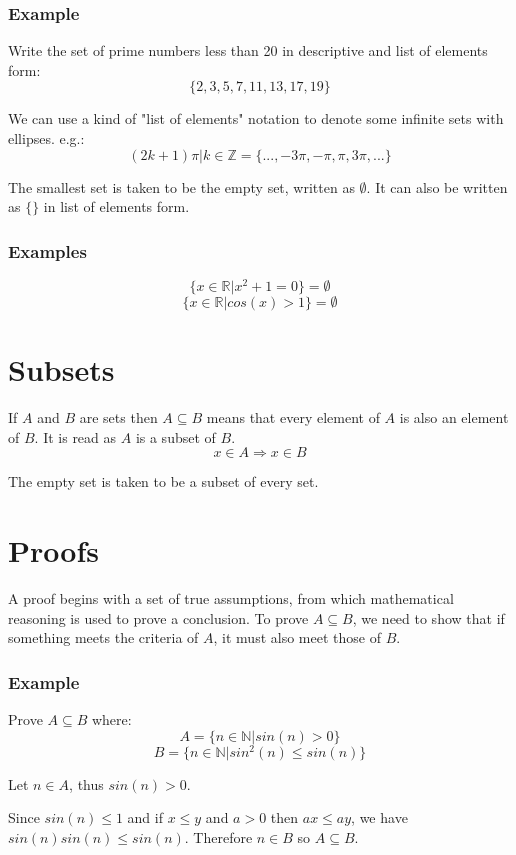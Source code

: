 \documentclass[12pt]{report}
\newcommand{\N}{\mathbb{N}}
\newcommand{\Z}{\mathbb{Z}}
\newcommand{\R}{\mathbb{R}}
\begin{document}
\begin{flushleft}
\subsubsection*{Example}
Write the set of prime numbers less than 20 in descriptive and list of elements form:
\[\{2, 3, 5, 7, 11, 13, 17, 19\}\]

We can use a kind of "list of elements" notation to denote some infinite sets with ellipses.
e.g.: \[(2k + 1)\pi | k \in \Z = \{..., -3\pi, -\pi, \pi, 3\pi, ...\}\]

The smallest set is taken to be the empty set, written as \(\emptyset\). It can also be written as 
\(\{\}\) in list of elements form.

\subsubsection*{Examples}
\[\{x \in \R | x^2 + 1 = 0\} = \emptyset\]
\[\{x \in \R | cos(x) > 1\} = \emptyset\]

\section*{Subsets}
If \(A\) and \(B\) are sets then \(A \subseteq B\) means that every element of \(A\) is also an element
of \(B\). It is read as \(A\) is a subset of \(B\).
\[x \in A \Rightarrow x \in B\]

The empty set is taken to be a subset of every set.

\section*{Proofs}
A proof begins with a set of true assumptions, from which mathematical reasoning is used
to prove a conclusion.
To prove \(A \subseteq B\), we need to show that if something meets the criteria of \(A\),
it must also meet those of \(B\).

\subsubsection*{Example}
Prove \(A \subseteq B\) where:
\[A = \{n \in \N | sin(n) > 0\}\]
\[B = \{n \in \N | sin^2(n) \leq sin(n)\}\]
\par
Let \(n \in A\), thus \(sin(n) > 0\).
\par
Since \(sin(n) \leq 1\) and if \(x \leq y\) and \(a > 0\) then \(ax \leq ay\), we have \(sin(n)sin(n) \leq sin(n)\).
Therefore \(n \in B\) so \(A \subseteq B\).


\end{flushleft}
\end{document}
